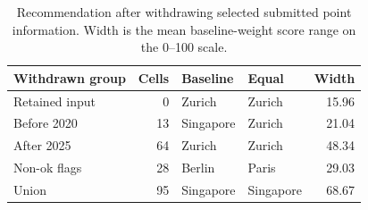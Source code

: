 \begin{table}[!ht]\centering
\caption{Recommendation after withdrawing selected submitted point information. Width is the mean baseline-weight score range on the 0--100 scale.}\label{tab:vintage}
\begin{tabular}{l r l l r}\toprule
Withdrawn group & Cells & Baseline & Equal & Width\\\midrule
Retained input & 0 & Zurich & Zurich & 15.96 \\
Before 2020 & 13 & Singapore & Zurich & 21.04 \\
After 2025 & 64 & Zurich & Zurich & 48.34 \\
Non-ok flags & 28 & Berlin & Paris & 29.03 \\
Union & 95 & Singapore & Singapore & 68.67 \\
\bottomrule\end{tabular}\end{table}
